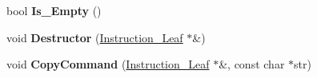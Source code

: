 \begin{DoxyCompactItemize}
\item 
\hypertarget{classInstruction__Tree_accb3231bdc3392cc49a8f6b6c79c82a1}{
bool {\bfseries Is\_\-Empty} ()}
\label{classInstruction__Tree_accb3231bdc3392cc49a8f6b6c79c82a1}

\item 
\hypertarget{classInstruction__Tree_aec22cabc78f01e5e543ddb0e6b15be56}{
void {\bfseries Destructor} (\hyperlink{structInstruction__Leaf}{Instruction\_\-Leaf} $\ast$\&)}
\label{classInstruction__Tree_aec22cabc78f01e5e543ddb0e6b15be56}

\item 
\hypertarget{classInstruction__Tree_ad53b5fae2cc7e47a3ec905eade35c8ae}{
void {\bfseries CopyCommand} (\hyperlink{structInstruction__Leaf}{Instruction\_\-Leaf} $\ast$\&, const char $\ast$str)}
\label{classInstruction__Tree_ad53b5fae2cc7e47a3ec905eade35c8ae}


\end{DoxyCompactItemize}
